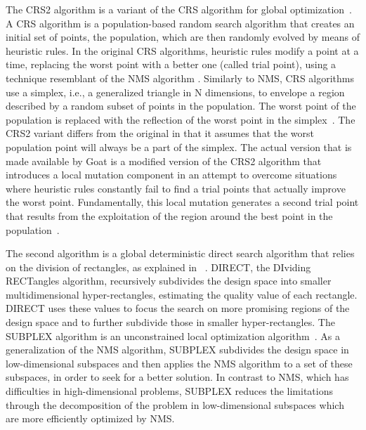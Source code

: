 The CRS2 algorithm is a variant of the \ac{CRS} algorithm for global optimization~\cite{Price1983}. A \ac{CRS} algorithm is a population-based random search algorithm that creates an initial set of points, the population, which are then randomly evolved by means of heuristic rules. In the original \ac{CRS} algorithms, heuristic rules modify a point at a time, replacing the worst point with a better one (called trial point), using a technique resemblant of the \ac{NMS} algorithm \cite{Nelder1964}. Similarly to \ac{NMS}, \ac{CRS} algorithms use a simplex, i.e., a generalized triangle in N dimensions, to envelope a region described by a random subset of points in the population. The worst point of the population is replaced with the reflection of the worst point in the simplex~\cite{Kaelo2006CRS2}. The CRS2 variant differs from the original in that it assumes that the worst population point will always be a part of the simplex. The actual version that is made available by Goat is a modified version of the CRS2 algorithm that introduces a local mutation component in an attempt to overcome situations where heuristic rules constantly fail to find a trial points that actually improve the worst point. Fundamentally, this local mutation generates a second trial point that results from the exploitation of the region around the best point in the population~\cite{Kaelo2006CRS2}.  

The second algorithm is a global deterministic direct search algorithm that relies on the division of rectangles, as explained in ~\cite{Jones1993DIRECT}. DIRECT, the DIviding RECTangles algorithm, recursively subdivides the design space into smaller multidimensional hyper-rectangles, estimating the quality value of each rectangle. DIRECT uses these values to focus the search on more promising regions of the design space and to further subdivide those in smaller hyper-rectangles. 
The SUBPLEX algorithm is an unconstrained local optimization algorithm~\cite{Rowan1990}. As a generalization of the \ac{NMS} algorithm, SUBPLEX subdivides the design space in low-dimensional subspaces and then applies the \ac{NMS} algorithm to a set of these subspaces, in order to seek for a better solution. In contrast to \ac{NMS}, which has difficulties in high-dimensional problems, SUBPLEX reduces the limitations through the decomposition of the problem in low-dimensional subspaces which are more efficiently optimized by \ac{NMS}.

